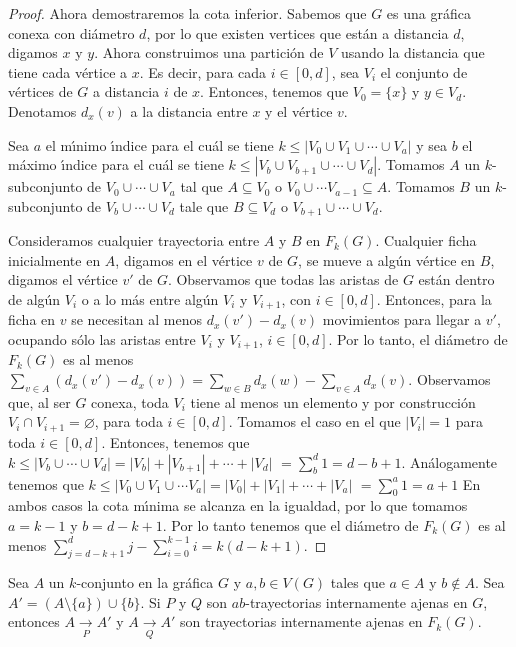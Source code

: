 \begin{proof}
Ahora demostraremos la cota inferior. Sabemos que $G$ es una gr\'afica conexa
con di\'ametro $d$, por lo que existen vertices que est\'an a distancia
$d$, digamos $x$ y $y$. Ahora construimos una partici\'on de $V$ usando  la
distancia que tiene cada v\'ertice a $x$. Es decir, para cada $i\in [0,d]$,
sea $V_{i}$ el conjunto de v\'ertices de $G$ a distancia $i$ de $x$. Entonces,
tenemos que $V_{0}=\{x\}$ y $y\in V_{d}$. Denotamos $d_x(v)$ a la distancia
entre $x$ y el v\'ertice $v$.

Sea $a$ el m\'\i{}nimo \'\i{}ndice para el cu\'al se tiene $k \leq |V_{0}\cup
V_{1}\cup \cdots \cup V_{a}|$ y sea $b$ el m\'aximo \'\i{}ndice para el cu\'al se
tiene $k\leq |V_{b}\cup V_{b+1}\cup \cdots \cup V_{d}|$. Tomamos $A$ un
$k$-subconjunto de $V_{0}\cup \cdots \cup V_{a}$  tal que $A\subseteq
V_{0}$ o $V_{0}\cup \cdots V_{a-1}\subseteq A$. Tomamos $B$ un
$k$-subconjunto de $V_{b}\cup \cdots \cup V_{d}$ tale que
$B\subseteq V_{d}$ o $V_{b+1}\cup \cdots \cup V_{d}$. 

Consideramos cualquier trayectoria entre $A$ y $B$ en $F_{k}(G)$. Cualquier
ficha inicialmente en $A$, digamos en el v\'ertice $v$ de $G$, se mueve a
alg\'un v\'ertice en $B$, digamos el v\'ertice $v'$ de $G$. Observamos que todas
las aristas de $G$ est\'an dentro de alg\'un $V_{i}$ o a lo m\'as entre alg\'un
$V_{i}$ y $V_{i+1}$, con $i\in[0,d]$. Entonces, para la ficha en $v$ se
necesitan al menos $d_x(v')-d_x(v)$ movimientos para llegar a $v'$, ocupando
s\'olo las aristas entre $V_{i}$ y $V_{i+1}$, $i\in [0,d]$. Por lo tanto,
el di\'ametro de $F_{k}(G)$ es al menos $\sum_{v\in A}(d_x(v')-d_x(v))=
\sum_{w\in B}d_x(w)-\sum_{v\in A}d_x(v)$. Observamos que, al ser $G$ conexa,
toda $V_{i}$ tiene al menos un elemento y por construcci\'on $V_{i} \cap
V_{i+1}=\varnothing$, para toda $i\in [0,d]$. Tomamos el caso en el que
$|V_{i}|=1$ para toda $i\in [0,d]$. Entonces, tenemos que $k\leq
|V_{b}\cup\cdots\cup V_{d}|=|V_{b}|+|V_{b+1}|+\cdots +|V_d|$
$=\sum_{b}^{d}1 = d -b+1$. An\'alogamente tenemos que $k\leq
|V_{0}\cup V_{1}\cup \cdots V_{a}|=|V_{0}|+|V_{1}|+\cdots + |V_{a}|$
$=\sum_{0}^{a} 1 = a+1$ En ambos casos la cota m\'\i{}nima se alcanza en la
igualdad, por lo que tomamos $a=k-1$ y $b=d-k+1$. Por lo tanto tenemos que
el di\'ametro de $F_{k}(G)$ es al menos $\sum_{j=d -k+1}^{d}j -
\sum_{i=0}^{k-1}i = k(d-k+1)$.
\end{proof}


\begin{lema}%
\label{lem:TrayIntAj-G-FG}
Sea $A$ un $k$-conjunto en la gr\'afica $G$ y $a, b \in V(G)$ tales que $a \in
A$ y $b \notin A$. Sea $A' = (A \setminus \{ a \}) \cup \{ b \}$. Si $P$ y $Q$
son $ab$-trayectorias internamente ajenas en $G$, entonces $A \xrightarrow[P]{}
A'$ y $A \xrightarrow[Q]{} A'$ son trayectorias internamente ajenas en
$F_{k}(G)$.
\end{lema}

